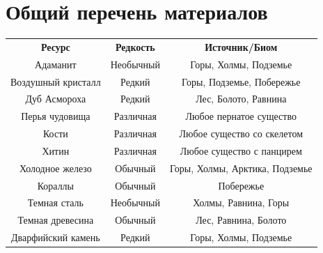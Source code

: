 \documentclass[a4paper, 9pt, twocolumn]{book}
\begin{document}
	
	
	\onecolumn
	
	\section{Общий перечень материалов}
		
		\begin{table}[H]
			
			\centering 
			
			\begin{tabularx}{0.8\linewidth}{C c C}
				
				\textbf{Ресурс} & \textbf{Редкость} & \textbf{Источник/Биом} \\
				
				Адаманит & Необычный & Горы, Холмы, Подземье \\
				
				Воздушный кристалл & Редкий & Горы, Подземье, Побережье \\
				
				Дуб Асмороха & Редкий & Лес, Болото, Равнина \\
				
				Перья чудовища & Различная & Любое пернатое существо \\
				
				Кости & Различная & Любое существо со скелетом \\
				
				Хитин & Различная & Любое существо с панцирем \\
				
				Холодное железо & Обычный & Горы, Холмы, Арктика, Подземье \\
				
				Кораллы & Обычный & Побережье \\
				
				Темная сталь & Необычный & Холмы, Равнина, Горы \\
				
				Темная древесина & Обычный & Лес, Равнина, Болото \\
				
				Дварфийский камень & Редкий & Горы, Холмы, Подземье \\
				

\end{tabularx}
\end{table}
\end{document}
